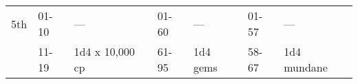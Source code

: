 \begin{longtable}{llllllllllllll}
{\begin{minipage}[t]{0.469in}
\end{minipage}}\\
\hline
\multicolumn{8}{p{1.150in}|}{\begin{minipage}[t]{1.150in}\centering
5th\end{minipage}} & \multicolumn{1}{|p{0.393in}|}{\begin{minipage}[t]{0.393in}\raggedright
01-10\end{minipage}} & \multicolumn{1}{p{0.469in}|}{\begin{minipage}[t]{0.469in}\raggedright
---\end{minipage}} & \multicolumn{1}{p{0.923in}|}{\begin{minipage}[t]{0.923in}\raggedright
01-60\end{minipage}} & \multicolumn{1}{p{0.469in}|}{\begin{minipage}[t]{0.469in}\raggedright
---\end{minipage}} & \multicolumn{1}{p{0.626in}|}{\begin{minipage}[t]{0.626in}\raggedright
01-57\end{minipage}} & \multicolumn{1}{p{0.469in}|}{\begin{minipage}[t]{0.469in}\centering
---\end{minipage}}\\
\hline
\multicolumn{8}{p{1.150in}|}{\begin{minipage}[t]{1.150in}\centering
\end{minipage}} & \multicolumn{1}{|p{0.393in}|}{\begin{minipage}[t]{0.393in}\raggedright
11-19\end{minipage}} & \multicolumn{1}{p{0.469in}|}{\begin{minipage}[t]{0.469in}\raggedright
1d4 x 10,000 cp\end{minipage}} & \multicolumn{1}{p{0.923in}|}{\begin{minipage}[t]{0.923in}\raggedright
61-95\end{minipage}} & \multicolumn{1}{p{0.469in}|}{\begin{minipage}[t]{0.469in}\raggedright
1d4 gems\end{minipage}} & \multicolumn{1}{p{0.626in}|}{\begin{minipage}[t]{0.626in}\raggedright
58-67\end{minipage}} & \multicolumn{1}{p{0.469in}|}{\begin{minipage}[t]{0.469in}\centering
1d4 mundane\end{minipage}}\\

\end{longtable}
